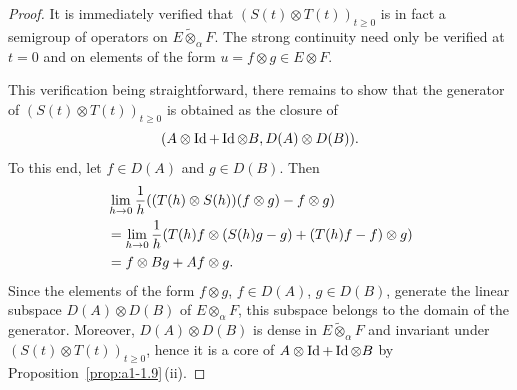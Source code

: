 \begin{proof}
It is immediately verified that $(S(t)\otimes T(t))_{t\geq 0}$ is in fact a semigroup of operators on 
$ E \widetilde{\otimes}_{\alpha} F $. 
The strong continuity need only be verified at $t = 0$ and on elements of the form $u = f \otimes g \in E \otimes F$.

This verification being straightforward, there remains to show that the generator of\/ $(S(t)\otimes T(t))_{t\geq 0}$ is obtained as the closure of 
%
\[
	(A \otimes \operatorname{Id} + \operatorname{Id} \otimes B,D(A) \otimes D(B)) .
\]
%
To this end, let $f \in D(A)$ and $g \in D(B)$. 
Then
\begin{align*}
    &\lim_{h\to 0} \frac{1}{h}\mleft(
        \mleft(T(h) \otimes S(h)\mright)(f \otimes g) - f \otimes g
      \mright) \\
    &= \lim_{h\to 0} \frac{1}{h}\mleft(
        T(h)f \otimes (S(h)g - g) + (T(h)f - f) \otimes g
      \mright) \\
    &= f \otimes Bg + Af \otimes g.
\end{align*}
Since the elements of the form $f \otimes g$, $f \in D(A)$, $g \in D(B)$, generate the linear subspace $D(A) \otimes D(B)$ of\/ $E \otimes_{\alpha} F$, this subspace belongs to the domain of the generator.
Moreover, $D(A) \otimes D(B)$ is dense in $E \widetilde{\otimes}_{\alpha} F$ and invariant under $(S(t)\otimes T(t))_{t\geq 0}$, hence it is a core of\/ $A \otimes \operatorname{Id} + \operatorname{Id} \otimes B$ by Proposition~\ref{prop:a1-1.9}\,(ii).
\end{proof}
